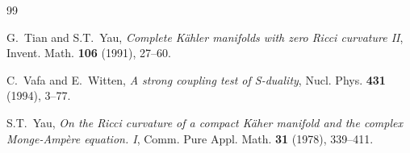 \documentclass[12pt]{amsart}
\theoremstyle{definition}
\theoremstyle{remark}
\numberwithin{equation}{section}
\begin{document}
\begin{thebibliography}{99}
%
%

 G.~Tian and S.T.~Yau,
{\it Complete K\"ahler manifolds with zero Ricci curvature II},
Invent. Math. {\bf 106} (1991), 27--60.

 C.~Vafa and E.~Witten,
{\it A strong coupling test of S-duality},
 Nucl. Phys. {\bf 431} (1994), 3--77.

 S.T.~Yau,
{\it On the Ricci curvature of a compact K\"aher manifold and the
  complex Monge-Amp\`ere equation. I},
Comm. Pure Appl. Math. {\bf 31} (1978), 339--411.

\end{thebibliography}
\end{document}
